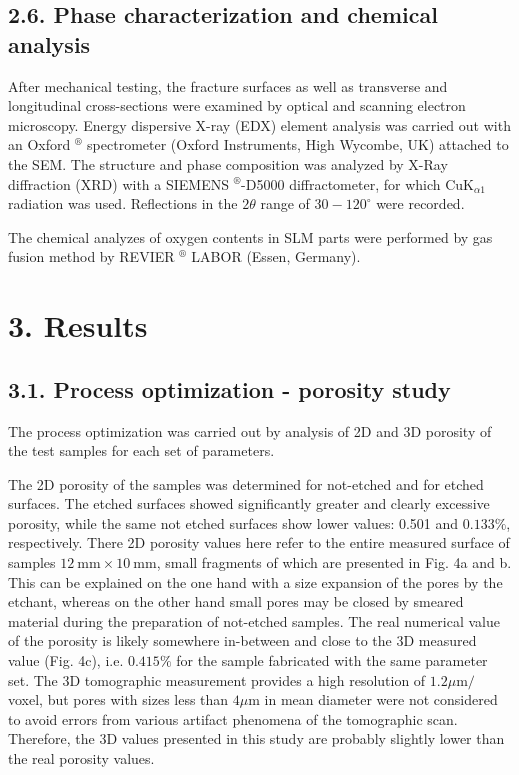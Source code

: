 \documentclass[10pt]{article}
\begin{document}
\subsection*{2.6. Phase characterization and chemical analysis}
After mechanical testing, the fracture surfaces as well as transverse and longitudinal cross-sections were examined by optical and scanning electron microscopy. Energy dispersive X-ray (EDX) element analysis was carried out with an Oxford ${ }^{\circledR}$ spectrometer (Oxford Instruments, High Wycombe, UK) attached to the SEM. The structure and phase composition was analyzed by X-Ray diffraction (XRD) with a SIEMENS ${ }^{\circledR}$-D5000 diffractometer, for which $\mathrm{CuK}_{\alpha 1}$ radiation was used. Reflections in the $2 \theta$ range of $30-120^{\circ}$ were recorded.

The chemical analyzes of oxygen contents in SLM parts were performed by gas fusion method by REVIER ${ }^{\circledR}$ LABOR (Essen, Germany).

\section*{3. Results}
\subsection*{3.1. Process optimization - porosity study}
The process optimization was carried out by analysis of 2D and $3 \mathrm{D}$ porosity of the test samples for each set of parameters.

The 2D porosity of the samples was determined for not-etched and for etched surfaces. The etched surfaces showed significantly greater and clearly excessive porosity, while the same not etched surfaces show lower values: 0.501 and $0.133 \%$, respectively. There 2D porosity values here refer to the entire measured surface of samples $12 \mathrm{~mm} \times 10 \mathrm{~mm}$, small fragments of which are presented in Fig. 4a and b. This can be explained on the one hand with a size expansion of the pores by the etchant, whereas on the other hand small pores may be closed by smeared material during the preparation of not-etched samples. The real numerical value of the porosity is likely somewhere in-between and close to the 3D measured value (Fig. 4c), i.e. $0.415 \%$ for the sample fabricated with the same parameter set. The 3D tomographic measurement provides a high resolution of $1.2 \mu \mathrm{m} /$ voxel, but pores with sizes less than $4 \mu \mathrm{m}$ in mean diameter were not considered to avoid errors from various artifact phenomena of the tomographic scan. Therefore, the $3 \mathrm{D}$ values presented in this study are probably slightly lower than the real porosity values.
\end{document}
